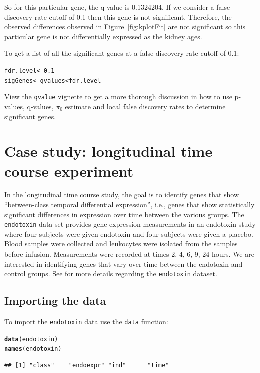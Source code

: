 \documentclass{article}\usepackage[]{graphicx}\usepackage[]{color}
\makeatletter
\newcommand{\hlnum}[1]{\textcolor[rgb]{0.686,0.059,0.569}{#1}}%
\newcommand{\hlopt}[1]{\textcolor[rgb]{0,0,0}{#1}}%
\newcommand{\hlstd}[1]{\textcolor[rgb]{0.345,0.345,0.345}{#1}}%
\newcommand{\hlkwb}[1]{\textcolor[rgb]{0.69,0.353,0.396}{#1}}%
\newcommand{\hlkwd}[1]{\textcolor[rgb]{0.737,0.353,0.396}{\textbf{#1}}}%
\newenvironment{kframe}{%
 \def\at@end@of@kframe{}%
 \ifinner\ifhmode%
  \def\at@end@of@kframe{\end{minipage}}%
  \begin{minipage}{\columnwidth}%
 \fi\fi%
 \def\FrameCommand##1{\hskip\@totalleftmargin \hskip-\fboxsep
 \colorbox{shadecolor}{##1}\hskip-\fboxsep
     \hskip-\linewidth \hskip-\@totalleftmargin \hskip\columnwidth}%
 \MakeFramed {\advance\hsize-\width
   \@totalleftmargin\z@ \linewidth\hsize
   \@setminipage}}%
 {\par\unskip\endMakeFramed%
 \at@end@of@kframe}
\newenvironment{knitrout}{}{} %
\makeatother
\begin{document}
So for this particular gene, the q-value is 0.1324204. If we consider a false discovery rate cutoff of 0.1 then this gene is not significant. Therefore, the observed differences observed in Figure~\ref{fig:kplotFit} are not significant so this particular gene is not differentially expressed as the kidney ages. 

To get a list of all the significant genes at a false discovery rate cutoff of 0.1:
\begin{knitrout}
\color{fgcolor}\begin{kframe}
\begin{alltt}
\hlstd{fdr.level} \hlkwb{<-} \hlnum{0.1}
\hlstd{sigGenes} \hlkwb{<-} \hlstd{qvalues} \hlopt{<} \hlstd{fdr.level}
\end{alltt}
\end{kframe}
\end{knitrout}

View the \href{http://www.bioconductor.org/packages/release/bioc/html/qvalue.html}{{\tt qvalue} vignette} to get a more thorough discussion in how to use p-values, q-values, $\pi_{0}$ estimate and local false discovery rates to determine significant genes.

\section{Case study: longitudinal time course experiment}
\label{sec:endotoxin}
In the longitudinal time course study, the goal is to identify genes that show ``between-class temporal differential expression'', i.e., genes that show statistically significant differences in expression over time between the various groups. The {\tt endotoxin} data set provides gene expression measurements in an endotoxin study where four subjects were given endotoxin and four subjects were given a placebo. Blood samples were collected and leukocytes were isolated from the samples before infusion. Measurements were recorded at times 2, 4, 6, 9, 24 hours. We are interested in identifying genes that vary over time between the endotoxin and control groups. See \cite{calvano:2005} for more details regarding the {\tt endotoxin} dataset.

\subsection{Importing the data}
To import the {\tt endotoxin} data use the {\tt data} function:
\begin{knitrout}
\color{fgcolor}\begin{kframe}
\begin{alltt}
\hlkwd{data}\hlstd{(endotoxin)}
\hlkwd{names}\hlstd{(endotoxin)}
\end{alltt}
\begin{verbatim}
## [1] "class"    "endoexpr" "ind"      "time"
\end{verbatim}
\end{kframe}
\end{knitrout}
\end{document}

